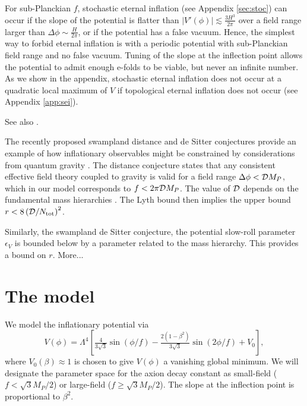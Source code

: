 \documentclass[aps,amsfonts,amsmath,prd,preprint,nofootinbib]{revtex4}
\newcommand{\Mp}{{M_{P}}}
\newcommand{\MMp}{{M_P^2}}
\newcommand{\beq}{\begin{equation}}
\newcommand{\eeq}{\end{equation}}
\begin{document}
For sub-Planckian $f$, stochastic 
eternal inflation (see Appendix \ref{sec:stoc}) can occur if 
the slope of the potential is flatter than $\left|V'(\phi)\right| \lesssim \frac{3H^3}{2\pi}$ over a field range larger 
than $\Delta\phi \sim \frac{H}{2\pi}$, or if the potential has a false vacuum.
Hence, the simplest way to forbid eternal inflation is with a periodic potential
with sub-Planckian field range and no false vacuum.  Tuning of the slope at the inflection point allows the potential to admit 
enough e-folds to be viable, but never an infinite number.  As we show in the appendix, stochastic eternal inflation does not occur at a quadratic
local maximum of $V$ if topological eternal inflation does not occur (see Appendix \ref{app:sei}).




See also \cite{Guth:1985ya}.


The recently proposed swampland distance and de Sitter conjectures provide an example of how inflationary observables might be 
constrained by considerations from quantum gravity \cite{Brown:2015iha}.  The distance conjecture
states that any consistent effective field theory coupled to gravity is valid for a field range $\Delta\phi < {\cal D}\Mp$, which in our 
model corresponds to $f < 2\pi {\cal D}\Mp$.  The value of ${\cal D}$ depends on
the fundamental mass hierarchies \cite{Dias:2018ngv}.  The Lyth bound \cite{} then implies the upper bound $r < 8\left({\cal D}/N_{\rm tot}\right)^2$.

Similarly, the swampland de Sitter conjecture, the potential slow-roll parameter $\epsilon_V$ is bounded below by a parameter related to the mass hierarchy.
This provides  \cite{Dias:2018ngv} a bound on $r$. More...


\section{The model}
 We model the inflationary potential via
\beq
V(\phi) = \Lambda^4\left[\tfrac{4}{3\sqrt{3}}\sin(\phi/f) -\tfrac{2(1 - \beta^2)}{3\sqrt{3}} \sin(2\phi/f) + V_0  \right], \label{eq:Vp}
\eeq
where $V_0(\beta) \approx 1$ is chosen to give $V(\phi)$ a vanishing global minimum.
We will designate the parameter space for the axion decay constant as small-field ($f < \sqrt{3}\Mp/2$) or large-field ($f \geq \sqrt{3}\Mp/2$). %
The slope at the inflection point is proportional to $\beta^2$.
\end{document}
